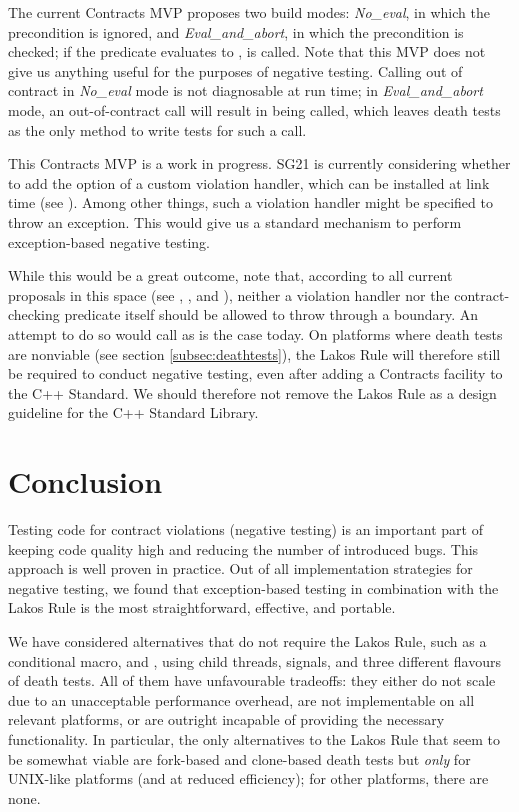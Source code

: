 The current Contracts MVP proposes two build modes: \emph{No_eval}, in which the precondition is ignored, and \emph{Eval_and_abort}, in which the precondition is checked; if the predicate evaluates to ,  is called. Note that this MVP does not give us anything useful for the purposes of negative testing. Calling  out of contract in \emph{No_eval} mode is not diagnosable at run time; in \mbox{\emph{Eval_and_abort}} mode, an out-of-contract call will result in  being called, which leaves death tests as the only method to write tests for such a call.

This Contracts MVP is a work in progress. SG21 is currently considering whether to add the option of a custom violation handler, which can be installed at link time (see \cite{P2811R3}). Among other things, such a violation handler might be specified to throw an exception. This would give us a standard mechanism to perform exception-based negative testing.

While this would be a great outcome, note that, according to all current proposals in this space (see \cite{P2698R0}, \cite{P2811R3}, and \cite{P2834R0}), neither a violation handler nor the contract-checking predicate itself should be allowed to throw through a  boundary. An attempt to do so would call  as is the case today. On platforms where death tests are nonviable (see section \ref{subsec:deathtests}), the Lakos Rule will therefore still be required to conduct negative testing, even after adding a Contracts facility to the C++ Standard. We should therefore not remove the Lakos Rule as a design guideline for the C++ Standard Library.

\section{Conclusion}

Testing code for contract violations (negative testing) is an important part of keeping code quality high and reducing the number of introduced bugs. This approach is well proven in practice. Out of all implementation strategies for negative testing, we found that exception-based testing in combination with the Lakos Rule is the most straightforward, effective, and portable.

We have considered alternatives that do not require the Lakos Rule, such as a conditional  macro,  and , using child threads, signals, and three different flavours of death tests. All of them have unfavourable tradeoffs: they either do not scale due to an unacceptable performance overhead, are not implementable on all relevant platforms, or are outright incapable of providing the necessary functionality. In particular, the only alternatives to the Lakos Rule that seem to be somewhat viable are fork-based and clone-based death tests but \emph{only} for UNIX-like platforms (and at reduced efficiency); for other platforms, there are none.

